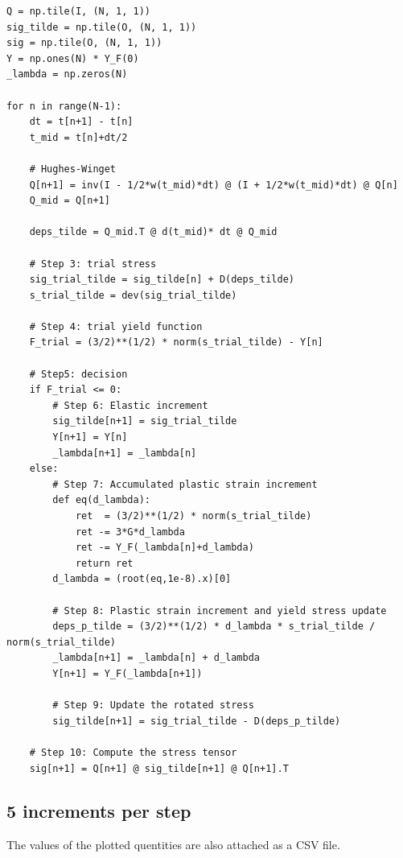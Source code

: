 \documentclass[12pt,a4paper]{article}
\begin{document}
\lstset{style=python}
\begin{lstlisting}
Q = np.tile(I, (N, 1, 1))
sig_tilde = np.tile(O, (N, 1, 1))
sig = np.tile(O, (N, 1, 1))
Y = np.ones(N) * Y_F(0)
_lambda = np.zeros(N)

for n in range(N-1):
    dt = t[n+1] - t[n]
    t_mid = t[n]+dt/2

    # Hughes-Winget
    Q[n+1] = inv(I - 1/2*w(t_mid)*dt) @ (I + 1/2*w(t_mid)*dt) @ Q[n]
    Q_mid = Q[n+1]

    deps_tilde = Q_mid.T @ d(t_mid)* dt @ Q_mid

    # Step 3: trial stress
    sig_trial_tilde = sig_tilde[n] + D(deps_tilde)
    s_trial_tilde = dev(sig_trial_tilde)

    # Step 4: trial yield function
    F_trial = (3/2)**(1/2) * norm(s_trial_tilde) - Y[n]

    # Step5: decision
    if F_trial <= 0:
        # Step 6: Elastic increment
        sig_tilde[n+1] = sig_trial_tilde
        Y[n+1] = Y[n]
        _lambda[n+1] = _lambda[n]
    else:
        # Step 7: Accumulated plastic strain increment
        def eq(d_lambda):
            ret  = (3/2)**(1/2) * norm(s_trial_tilde)
            ret -= 3*G*d_lambda
            ret -= Y_F(_lambda[n]+d_lambda)
            return ret
        d_lambda = (root(eq,1e-8).x)[0]
        
        # Step 8: Plastic strain increment and yield stress update
        deps_p_tilde = (3/2)**(1/2) * d_lambda * s_trial_tilde / norm(s_trial_tilde)
        _lambda[n+1] = _lambda[n] + d_lambda
        Y[n+1] = Y_F(_lambda[n+1])
        
        # Step 9: Update the rotated stress
        sig_tilde[n+1] = sig_trial_tilde - D(deps_p_tilde)
    
    # Step 10: Compute the stress tensor
    sig[n+1] = Q[n+1] @ sig_tilde[n+1] @ Q[n+1].T
\end{lstlisting}

\newpage

\subsection*{5 increments per step}

The values of the plotted quentities are also attached as a CSV file.
\end{document}
